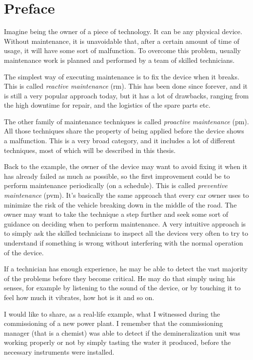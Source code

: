 \section{Preface}
\label{sec:preface}

Imagine being the owner of a piece of technology. It can be any physical device. Without maintenance, it is unavoidable that, after a certain amount of time of usage, it will have some sort of malfunction.
To overcome this problem, usually maintenance work is planned and performed by a team of skilled technicians. 

The simplest way of executing maintenance is to fix the device when it breaks. This is called \emph{reactive maintenance} (\gls{rm}). This has been done since forever, and it is still a very popular approach today, but it has a lot of drawbacks, ranging from the high downtime for repair, and the logistics of the spare parts etc.

The other family of maintenance techniques is called \emph{proactive maintenance} (\gls{pm}). All those techniques share the property of being applied before the device shows a malfunction. This is a very broad category, and it includes a lot of different techniques, most of which will be described in this thesis.

Back to the example, the owner of the device may want to avoid fixing it when it has already failed as much as possible, so the first improvement could be to perform maintenance periodically (on a schedule). This is called \emph{preventive maintenance} (\gls{pvm}). It's basically the same approach that every car owner uses to minimize the risk of the vehicle breaking down in the middle of the road. 
The owner may want to take the technique a step further and seek some sort of guidance on deciding when to perform maintenance. A very intuitive approach is to simply ask the skilled technicians to inspect all the devices very often to try to understand if something is wrong without interfering with the normal operation of the device.

If a technician has enough experience, he may be able to detect the vast majority of the problems before they become critical. He may do that simply using his senses, for example by listening to the sound of the device, or by touching it to feel how much it vibrates, how hot is it and so on. 

I would like to share, as a real-life example, what I witnessed during the commissioning of a new power plant. I remember that the commissioning manager (that is a chemist) was able to detect if the demineralization unit was working properly or not by simply tasting the water it produced, before the necessary instruments were installed.

